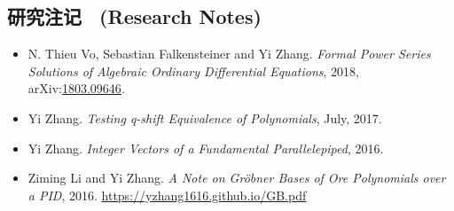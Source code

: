 \documentclass[a4paper,12pt]{article}
\begin{document}
\begin{CJK*}{UTF8}{gbsn}
\section*{\Large{研究注记 \ (Research Notes)}}
\begin{itemize}
  \item N. Thieu Vo, Sebastian Falkensteiner and Yi Zhang.
 {\em Formal Power Series Solutions of Algebraic Ordinary Differential Equations}, 
 2018, arXiv:\href{https://arxiv.org/abs/1803.09646}{1803.09646}.
 \item Yi Zhang. {\em Testing q-shift Equivalence of Polynomials}, July, 2017.
 \item Yi Zhang. {\em Integer Vectors of a Fundamental Parallelepiped}, 2016.
 \item Ziming Li and Yi Zhang. {\em A Note on Gr\"{o}bner Bases of Ore Polynomials over a PID}, 2016. 
 \url{https://yzhang1616.github.io/GB.pdf} 
\end{itemize}



\end{CJK*}
\end{document}
